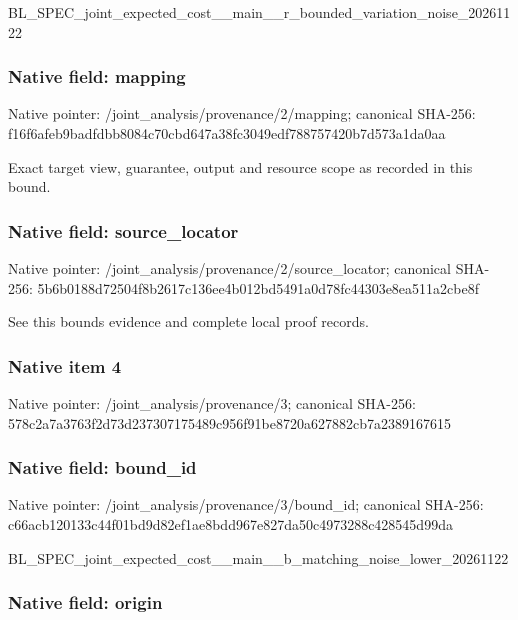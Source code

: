 \documentclass[10pt,a4paper]{article}
\begin{document}
BL\_SPEC\_joint\_expected\_c\allowbreak{}ost\_\_main\_\_r\_bounded\_var\allowbreak{}iation\_noise\_20261122


\subsubsection{Native field: mapping}


Native pointer: /joint\_analysis/provenance/2/mapping; canonical SHA-256: f16f6afeb9badfdbb8084c70\allowbreak{}cbd647a38fc3049edf788757\allowbreak{}420b7d573a1da0aa


Exact target view, guarantee, output and resource scope as recorded in this bound.


\subsubsection{Native field: source\_locator}


Native pointer: /joint\_analysis/provenan\allowbreak{}ce/2/source\_locator; canonical SHA-256: 5b6b0188d72504f8b2617c13\allowbreak{}6ee4b012bd5491a0d78fc443\allowbreak{}03e8ea511a2cbe8f


See this bounds evidence and complete local proof records.


\subsubsection{Native item 4}


Native pointer: /joint\_analysis/provenance/3; canonical SHA-256: 578c2a7a3763f2d73d237307\allowbreak{}175489c956f91be8720a6278\allowbreak{}82cb7a2389167615



\subsubsection{Native field: bound\_id}


Native pointer: /joint\_analysis/provenance/3/bound\_id; canonical SHA-256: c66acb120133c44f01bd9d82\allowbreak{}ef1ae8bdd967e827da50c497\allowbreak{}3288c428545d99da


BL\_SPEC\_joint\_expected\_c\allowbreak{}ost\_\_main\_\_b\_matching\_no\allowbreak{}ise\_lower\_20261122


\subsubsection{Native field: origin}
\end{document}
